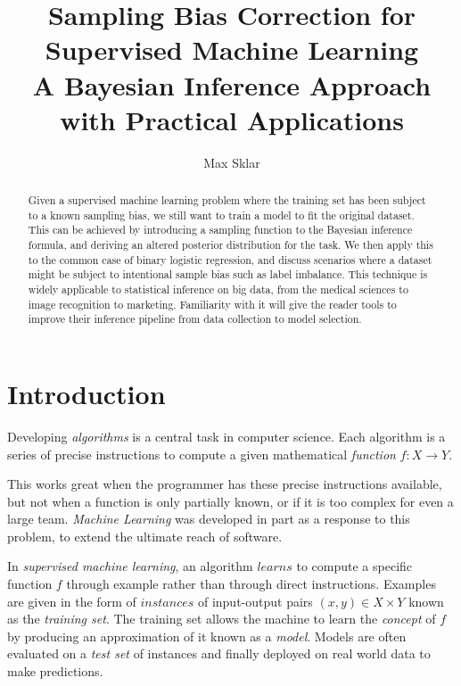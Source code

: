 \documentclass[twoside]{article}
\begin{document}
\parindent=0in
\parskip=12pt


\title{
  Sampling Bias Correction for Supervised Machine Learning \\
  \large{
    A Bayesian Inference Approach with Practical Applications
  }
}

\author{Max Sklar}

\maketitle
\thispagestyle{empty}

\begin{abstract}
Given a supervised machine learning problem where the training set has been subject to a known sampling bias, we still want to train a model to fit the original dataset. This can be achieved by introducing a sampling function to the Bayesian inference formula, and deriving an altered posterior distribution for the task. We then apply this to the common case of binary logistic regression, and discuss scenarios where a dataset might be subject to intentional sample bias such as label imbalance. This technique is widely applicable to statistical inference on big data, from the medical sciences to image recognition to marketing. Familiarity with it will give the reader tools to improve their inference pipeline from data collection to model selection. 
\end{abstract}

\section{Introduction}
\label{section:introduction}

Developing \textit{algorithms} is a central task in computer science. Each algorithm is a series of precise instructions to compute a given mathematical \textit{function} \(f: X \to Y\).

This works great when the programmer has these precise instructions available, but not when a function is only partially known, or if it is too complex for even a large team. \textit{Machine Learning} was developed in part as a response to this problem, to extend the ultimate reach of software. 

In \textit{supervised machine learning}, an algorithm \(learns\) to compute a specific function \(f\) through example rather than through direct instructions. Examples are given in the form of \(instances\) of input-output pairs \((x, y) \in X \times Y\) known as the \textit{training set}. The training set allows the machine to learn the \textit{concept} of \(f\) by producing an approximation of it known as a \textit{model}. Models are often evaluated on a \textit{test set} of instances and finally deployed on real world data to make predictions.
\end{document}
